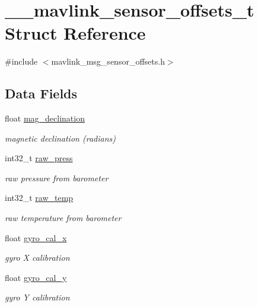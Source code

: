 \hypertarget{struct____mavlink__sensor__offsets__t}{\section{\+\_\+\+\_\+mavlink\+\_\+sensor\+\_\+offsets\+\_\+t Struct Reference}
\label{struct____mavlink__sensor__offsets__t}
}


{\ttfamily \#include $<$mavlink\+\_\+msg\+\_\+sensor\+\_\+offsets.\+h$>$}

\subsection*{Data Fields}
\begin{DoxyCompactItemize}
\item 
float \hyperlink{struct____mavlink__sensor__offsets__t_a76cf7e61c10ee460f75efa097173f531}{mag\+\_\+declination}
\begin{DoxyCompactList}\small\item\em magnetic declination (radians) \end{DoxyCompactList}\item 
int32\+\_\+t \hyperlink{struct____mavlink__sensor__offsets__t_aca20a64310b104873670ae597116ae59}{raw\+\_\+press}
\begin{DoxyCompactList}\small\item\em raw pressure from barometer \end{DoxyCompactList}\item 
int32\+\_\+t \hyperlink{struct____mavlink__sensor__offsets__t_a57a351a757513912f91f04c0f44e1f66}{raw\+\_\+temp}
\begin{DoxyCompactList}\small\item\em raw temperature from barometer \end{DoxyCompactList}\item 
float \hyperlink{struct____mavlink__sensor__offsets__t_a44bd292a9aa32076f208c751391d8d9c}{gyro\+\_\+cal\+\_\+x}
\begin{DoxyCompactList}\small\item\em gyro X calibration \end{DoxyCompactList}\item 
float \hyperlink{struct____mavlink__sensor__offsets__t_ad7dcd0fc2109e910d0d25dfaf204da99}{gyro\+\_\+cal\+\_\+y}
\begin{DoxyCompactList}\small\item\em gyro Y calibration \end{DoxyCompactList}\item 

\end{DoxyCompactItemize}
